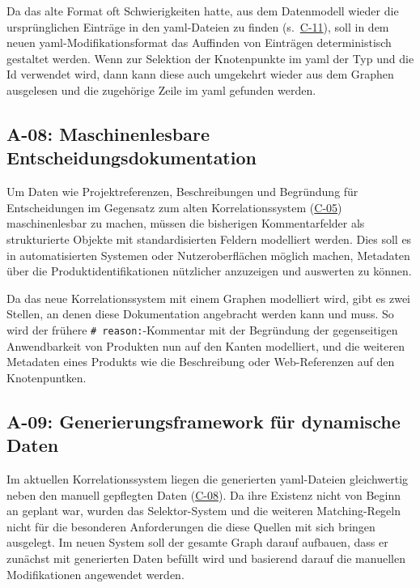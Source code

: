 Da das alte Format oft Schwierigkeiten hatte, aus dem Datenmodell wieder die ursprünglichen Einträge in den \acrshort{yaml}-Dateien zu finden (s.\ \hyperref[subsec:c-11-finding-yaml-entries]{C-11}), soll in dem neuen \acrshort{yaml}-Modifikationsformat das Auffinden von Einträgen deterministisch gestaltet werden.
Wenn zur Selektion der Knotenpunkte im \acrshort{yaml} der Typ und die Id verwendet wird, dann kann diese auch umgekehrt wieder aus dem Graphen ausgelesen und die zugehörige Zeile im \acrshort{yaml} gefunden werden.

\subsection{A-08: Maschinenlesbare Entscheidungsdokumentation}\label{subsec:req-reason-format}

Um Daten wie Projektreferenzen, Beschreibungen und Begründung für Entscheidungen im Gegensatz zum alten Korrelationssystem (\hyperref[subsec:c-05-reason-not-good-enough]{C-05}) maschinenlesbar zu machen, müssen die bisherigen Kommentarfelder als strukturierte Objekte mit standardisierten Feldern modelliert werden.
Dies soll es in automatisierten Systemen oder Nutzeroberflächen möglich machen, Metadaten über die Produktidentifikationen nützlicher anzuzeigen und auswerten zu können.

Da das neue Korrelationssystem mit einem Graphen modelliert wird, gibt es zwei Stellen, an denen diese Dokumentation angebracht werden kann und muss.
So wird der frühere \texttt{\# reason:}-Kommentar mit der Begründung der gegenseitigen Anwendbarkeit von Produkten nun auf den Kanten modelliert, und die weiteren Metadaten eines Produkts wie die Beschreibung oder Web-Referenzen auf den Knotenpuntken.

\subsection{A-09: Generierungsframework für dynamische Daten}\label{subsec:req-generated-data}

Im aktuellen Korrelationssystem liegen die generierten \acrshort{yaml}-Dateien gleichwertig neben den manuell gepflegten Daten (\hyperref[subsec:c-08-generated-correlation-data]{C-08}).
Da ihre Existenz nicht von Beginn an geplant war, wurden das Selektor-System und die weiteren Matching-Regeln nicht für die besonderen Anforderungen die diese Quellen mit sich bringen ausgelegt.
Im neuen System soll der gesamte Graph darauf aufbauen, dass er zunächst mit generierten Daten befüllt wird und basierend darauf die manuellen Modifikationen angewendet werden.

